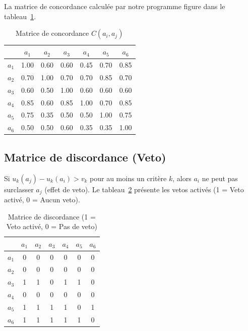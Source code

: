 \documentclass[11pt,a4paper]{article}
\begin{document}
La matrice de concordance calculée par notre programme figure dans le tableau~\ref{tab:concordance}.

\begin{table}[H]
  \centering
  \caption{Matrice de concordance $C(a_i, a_j)$}
  \label{tab:concordance}
  \begin{tabular}{ccccccc}
    \toprule
    & $a_1$ & $a_2$ & $a_3$ & $a_4$ & $a_5$ & $a_6$ \\
    \midrule
    $a_1$ & 1.00 & 0.60 & 0.60 & 0.45 & 0.70 & 0.85 \\
    $a_2$ & 0.70 & 1.00 & 0.70 & 0.70 & 0.85 & 0.70 \\
    $a_3$ & 0.60 & 0.50 & 1.00 & 0.60 & 0.60 & 0.60 \\
    $a_4$ & 0.85 & 0.60 & 0.85 & 1.00 & 0.70 & 0.85 \\
    $a_5$ & 0.75 & 0.35 & 0.50 & 0.50 & 1.00 & 0.75 \\
    $a_6$ & 0.50 & 0.50 & 0.60 & 0.35 & 0.35 & 1.00 \\
    \bottomrule
  \end{tabular}
\end{table}

\subsection{Matrice de discordance (Veto)}
Si $u_k(a_j) - u_k(a_i) > v_k$ pour au moins un critère $k$, alors $a_i$ ne peut pas surclasser $a_j$ (effet de veto). Le tableau~\ref{tab:discordance} présente les vetos activés (1 = Veto activé, 0 = Aucun veto).

\begin{table}[H]
  \centering
  \caption{Matrice de discordance (1 = Veto activé, 0 = Pas de veto)}
  \label{tab:discordance}
  \begin{tabular}{ccccccc}
    \toprule
    & $a_1$ & $a_2$ & $a_3$ & $a_4$ & $a_5$ & $a_6$ \\
    \midrule
    $a_1$ & 0 & 0 & 0 & 0 & 0 & 0 \\
    $a_2$ & 0 & 0 & 0 & 0 & 0 & 0 \\
    $a_3$ & 1 & 1 & 0 & 1 & 1 & 0 \\
    $a_4$ & 0 & 0 & 0 & 0 & 0 & 0 \\
    $a_5$ & 1 & 1 & 1 & 1 & 0 & 1 \\
    $a_6$ & 1 & 1 & 1 & 1 & 1 & 0 \\
    \bottomrule
  \end{tabular}
\end{table}
\end{document}
